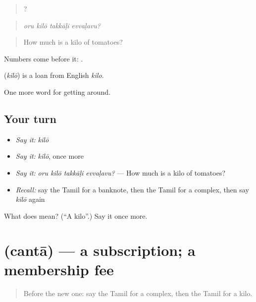 \begin{quote}
   ?
\end{quote}

\begin{quote}
\emph{oru kilō takkāḷi evvaḷavu?}
\end{quote}

\begin{quote}
How much is a kilo of tomatoes?
\end{quote}

Numbers come before it:   .

\begin{cousinweb}
\textbf{} (\emph{kilō}) is a loan from English \emph{kilo}.
\end{cousinweb}

\begin{grammarlens}[title={What you've built}]
One more word for getting around.
\end{grammarlens}

\subsection*{Your turn}
\begin{itemize}
\raggedright
  \item \emph{Say it:} \emph{kilō}
  \item \emph{Say it:} \emph{kilō}, once more
  \item \emph{Say it:} \emph{oru kilō takkāḷi evvaḷavu?} — How much is a kilo of tomatoes?
  \item \emph{Recall:} say the Tamil for a banknote, then the Tamil for a complex, then say \emph{kilō} again
\end{itemize}

\begin{tcolorbox}[breakable,colback=teal!4,colframe=teal!35!black,title={Before you move on}]
What does  mean? (\textquotedblleft{}A kilo\textquotedblright{}.) Say it once more.
\end{tcolorbox}
\section[\texorpdfstring{\ta{சந்தா} (cantā)}{சந்தா (cantā)}]{ (cantā) — a subscription; a membership fee}

\label{lesson:TA-C451-canta}



\begin{quote}
Before the new one: say the Tamil for a complex, then the Tamil for a kilo.
\end{quote}

